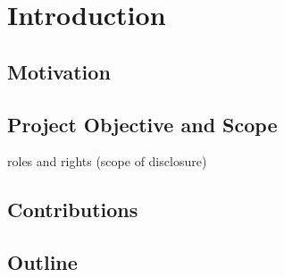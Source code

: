 \chapter{Introduction}

\section{Motivation}

\section{Project Objective and Scope}

roles and rights (scope of disclosure)

\section{Contributions}

\section{Outline}